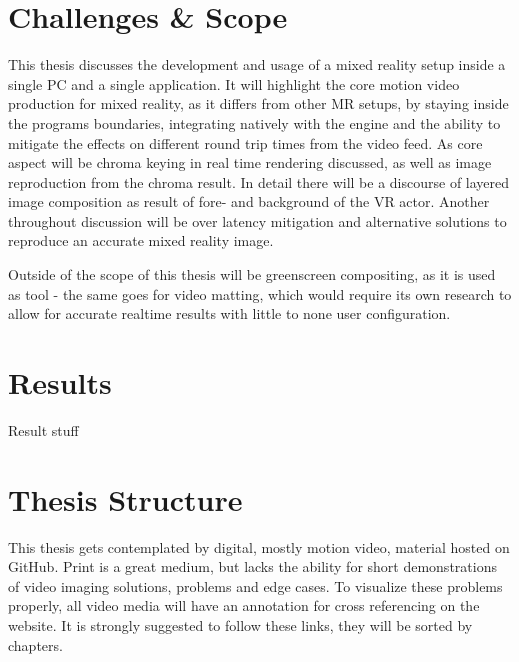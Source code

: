 \section{Challenges \& Scope}
\label{sec:intro:challenges}

This thesis discusses the development and usage of a mixed reality setup inside 
a single PC and a single application.
\newline
It will highlight the core motion video production for mixed reality, as it 
differs from other MR setups, by staying inside the programs boundaries, 
integrating natively with the engine and the ability to mitigate the effects on 
different round trip times from the video feed. 
\newline
As core aspect will be chroma keying in real time rendering discussed, as well 
as image reproduction from the chroma result. In detail there will be a 
discourse of layered image composition as result of fore- and background of the 
VR actor.
\newline
Another throughout discussion will be over latency mitigation and alternative 
solutions to reproduce an accurate mixed reality image.

Outside of the scope of this thesis will be greenscreen compositing, as it is 
used as tool - the same goes for video matting, which would require its own 
research to allow for accurate realtime results with little to none user 
configuration. 



\section{Results}
\label{sec:intro:results}

Result stuff

\section{Thesis Structure}
\label{sec:intro:structure}

This thesis gets contemplated by digital, mostly motion video, material hosted 
on GitHub. Print is a great medium, but lacks the ability for short 
demonstrations of video imaging solutions, problems and edge cases. To 
visualize these problems properly, all video media will have an annotation for 
cross referencing on the website. It is strongly suggested to follow these 
links, they will be sorted by chapters.